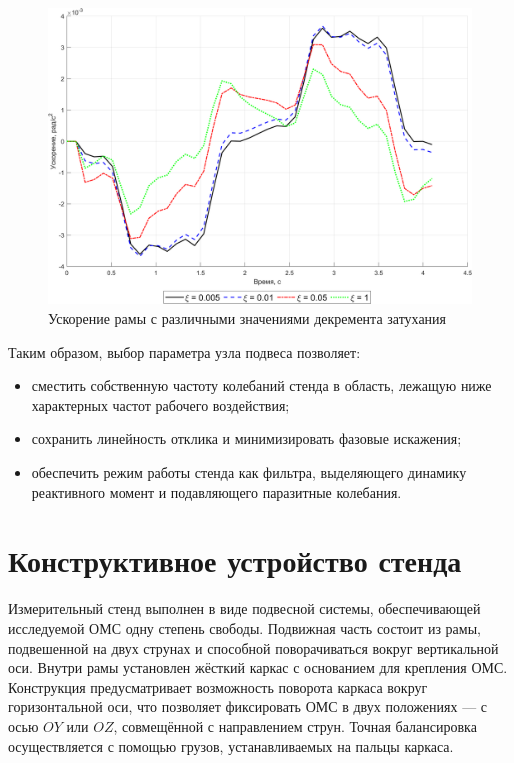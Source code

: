 \begin{figure}[!h]
	\centering
	\includegraphics[scale=0.7]{matlab/decrement.png}
	\caption{Ускорение рамы с различными значениями декремента затухания}
	\label{fig:decrement}
\end{figure}

Таким образом, выбор параметра узла подвеса позволяет:

\begin{itemize}
	\item сместить собственную частоту колебаний стенда в область, лежащую ниже характерных частот рабочего воздействия;
	\item сохранить линейность отклика и минимизировать фазовые искажения;
	\item обеспечить режим работы стенда как фильтра, выделяющего динамику реактивного момент и подавляющего паразитные колебания.
\end{itemize}

\section{Конструктивное устройство стенда}

Измерительный стенд выполнен в виде подвесной системы, обеспечивающей исследуемой ОМС одну степень свободы. Подвижная часть состоит из рамы, подвешенной на двух струнах и способной поворачиваться вокруг вертикальной оси. Внутри рамы установлен жёсткий каркас с основанием для крепления ОМС. Конструкция предусматривает возможность поворота каркаса вокруг горизонтальной оси, что позволяет фиксировать ОМС в двух положениях — с осью $OY$ или $OZ$, совмещённой с направлением струн. Точная балансировка осуществляется с помощью грузов, устанавливаемых на пальцы каркаса.

